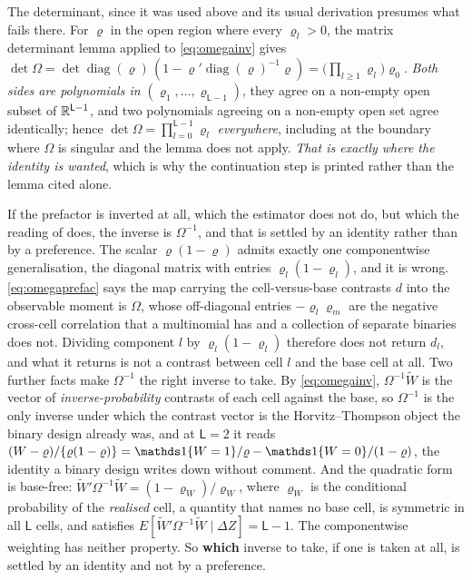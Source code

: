 The determinant, since it was used above and its usual derivation presumes what fails there. For
$\varrho$ in the open region where every $\varrho_l>0$, the matrix determinant lemma applied to
\eqref{eq:omegainv} gives
$\det\Omega=\det\operatorname{diag}(\varrho)\,(1-\varrho'\operatorname{diag}(\varrho)^{-1}\varrho)
=\big(\prod_{l\ge1}\varrho_l\big)\varrho_0$. \emph{Both sides are polynomials in
$(\varrho_1,\dots,\varrho_{\mathsf L-1})$}, they agree on a non-empty open subset of
$\mathbb{R}^{\mathsf L-1}$, and two polynomials agreeing on a non-empty open set agree identically; hence
$\det\Omega=\prod_{l=0}^{\mathsf L-1}\varrho_l$ \emph{everywhere}, including at the boundary where
$\Omega$ is singular and the lemma does not apply. \emph{That is exactly where the identity is wanted},
which is why the continuation step is printed rather than the lemma cited alone.

\medskip
\noindent
 If the prefactor is inverted at all, which the estimator does not do, but which the reading of
 does, the inverse is $\Omega^{-1}$, and that is settled by an identity rather
than by a preference.
The scalar $\varrho(1-\varrho)$ admits exactly one componentwise generalisation, the diagonal
matrix with entries $\varrho_l(1-\varrho_l)$, and it is wrong. \eqref{eq:omegaprefac} says the map
carrying the cell-versus-base contrasts $d$ into the observable moment is $\Omega$, whose off-diagonal
entries $-\varrho_l\varrho_m$ are the negative cross-cell correlation that a multinomial has and a
collection of separate binaries does not. Dividing component $l$ by $\varrho_l(1-\varrho_l)$ therefore
does not return $d_l$, and what it returns is not a contrast between cell $l$ and the base cell at all.
Two further facts make $\Omega^{-1}$ the right inverse to take. By \eqref{eq:omegainv},
$\Omega^{-1}\widetilde W$ is the vector of \emph{inverse-probability} contrasts of each cell against the
base, so $\Omega^{-1}$ is the only inverse under which the contrast vector is the
Horvitz--Thompson object the binary design already was, and at $\mathsf L=2$ it reads
$(W-\varrho)/\{\varrho(1-\varrho)\}=\un\{W=1\}/\varrho-\un\{W=0\}/(1-\varrho)$, the identity a binary
design writes down without comment. And the quadratic form is base-free:
$\widetilde W'\Omega^{-1}\widetilde W=(1-\varrho_W)/\varrho_W$, where $\varrho_W$ is the conditional
probability of the \emph{realised} cell, a quantity that names no base cell, is symmetric in all
$\mathsf L$ cells, and satisfies $E[\widetilde W'\Omega^{-1}\widetilde W\mid\Delta Z]=\mathsf L-1$. The
componentwise weighting has neither property. So \textbf{which} inverse to take, if one is taken at
all, is settled by an identity and not by a preference.

